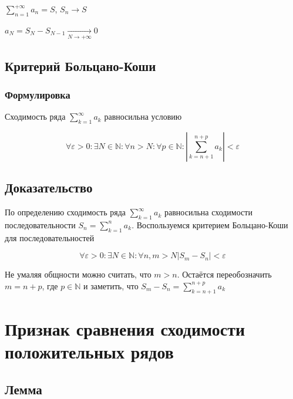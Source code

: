 \documentclass{article}
\begin{document}
                $\sum\limits^{+\infty}_{n = 1} a_n = S$, $S_n \rightarrow S$
                
                $a_N = S_N - S_{N - 1} \xrightarrow[N \rightarrow +\infty]{} 0$
                
        \subsection{Критерий Больцано-Коши}
        
            \subsubsection{Формулировка}
            
                Сходимость ряда $\sum\limits^{\infty}_{k = 1} a_k$ равносильна условию
            
                $$\forall \varepsilon > 0 : \exists N \in \mathbb{N} : \forall n > N : \forall p \in \mathbb{N} : \left| \sum\limits^{n + p}_{k = n + 1} a_k \right| < \varepsilon$$
            
            \subsection{Доказательство}
            
                По определению сходимость ряда $\sum\limits^{\infty}_{k = 1} a_k$ равносильна сходимости последовательности $S_n = \sum\limits^n_{k = 1} a_k$. Воспользуемся критерием Больцано-Коши для последовательностей 
                
                $$\forall \varepsilon > 0 : \exists N \in \mathbb{N} : \forall n, m > N |S_m - S_n| < \varepsilon$$
                
                Не умаляя общности можно считать, что $m > n$. Остаётся переобозначить $m = n + p$, где $p \in \mathbb{N}$ и заметить, что $S_m - S_n = \sum\limits^{n+p}_{k = n + 1} a_k$
                
    \newpage
    
    \section{Признак сравнения сходимости положительных рядов}
    
        \subsection{Лемма}
        
\end{document}
